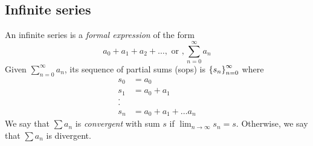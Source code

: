 \documentclass[12pt]{article}
\begin{document}
\subsection{Infinite series}
\begin{defn} \label{defn:infinite series}
    An infinite series is a \emph{formal expression} of the form \[
        a_{0} + a_{1} + a_{2} + \dots, \text{ or }, \sum_{n=0}^{\infty} a_{n}
    \]
    Given $\sum_{n=0}^{\infty} a_{n}$, its sequence of partial sums (sops) is $\set{s_{n}}_{n=0}^{\infty}$ where
    \begin{align*}
        s_{0} &= a_{0} \\
        s_{1} &= a_{0} + a_{1} \\
        .\\
        .\\
        s_{n} &= a_{0} + a_{1} + \dots a_{n}
    \end{align*}
    We say that $\sum a_{n}$ is \emph{convergent} with sum $s$ if $\lim_{n \to \infty} s_{n} = s$. Otherwise, we say that $\sum a_{n}$ is divergent.
\end{defn}
\end{document}
